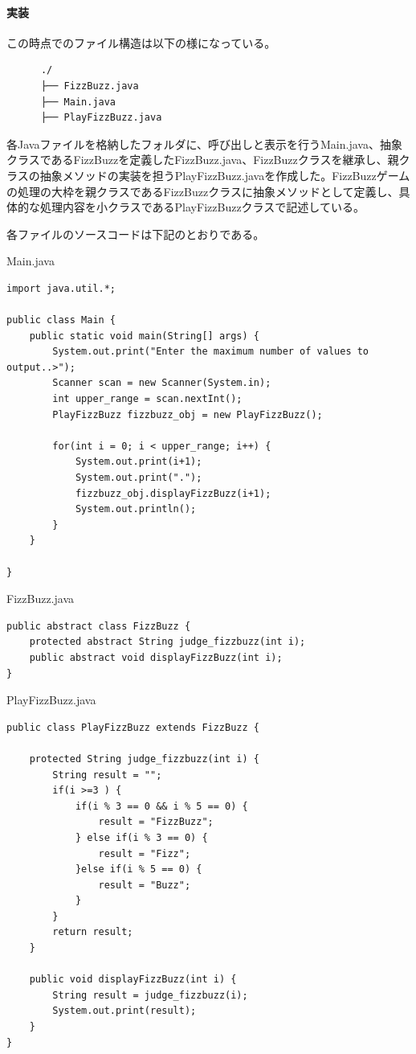 \documentclass[dvipdfmx]{jsarticle}
\begin{document}
\paragraph{実装}
この時点でのファイル構造は以下の様になっている。
\begin{verbatim}
      ./
      ├── FizzBuzz.java
      ├── Main.java
      ├── PlayFizzBuzz.java
\end{verbatim}
各Javaファイルを格納したフォルダに、呼び出しと表示を行うMain.java、抽象クラスであるFizzBuzzを定義したFizzBuzz.java、FizzBuzzクラスを継承し、親クラスの抽象メソッドの実装を担うPlayFizzBuzz.javaを作成した。FizzBuzzゲームの処理の大枠を親クラスであるFizzBuzzクラスに抽象メソッドとして定義し、具体的な処理内容を小クラスであるPlayFizzBuzzクラスで記述している。\par
各ファイルのソースコードは下記のとおりである。
\begin{itembox}[l]{Main.java}
  \begin{verbatim}
import java.util.*;

public class Main {
    public static void main(String[] args) {
        System.out.print("Enter the maximum number of values to output..>");
        Scanner scan = new Scanner(System.in);
        int upper_range = scan.nextInt();
        PlayFizzBuzz fizzbuzz_obj = new PlayFizzBuzz();

        for(int i = 0; i < upper_range; i++) {
            System.out.print(i+1);
            System.out.print(".");
            fizzbuzz_obj.displayFizzBuzz(i+1);
            System.out.println();
        }
    }

}
  \end{verbatim}
\end{itembox}
\begin{itembox}[l]{FizzBuzz.java}
  \begin{verbatim}
public abstract class FizzBuzz {
    protected abstract String judge_fizzbuzz(int i);
    public abstract void displayFizzBuzz(int i);
}
  \end{verbatim}
\end{itembox}
\begin{itembox}[l]{PlayFizzBuzz.java}
  \begin{verbatim}
public class PlayFizzBuzz extends FizzBuzz {

    protected String judge_fizzbuzz(int i) {
        String result = "";
        if(i >=3 ) {
            if(i % 3 == 0 && i % 5 == 0) {
                result = "FizzBuzz";
            } else if(i % 3 == 0) {
                result = "Fizz";
            }else if(i % 5 == 0) {
                result = "Buzz";
            }
        }
        return result;
    }

    public void displayFizzBuzz(int i) {
        String result = judge_fizzbuzz(i);
        System.out.print(result);
    }
}
  \end{verbatim}
\end{itembox}
\end{document}
